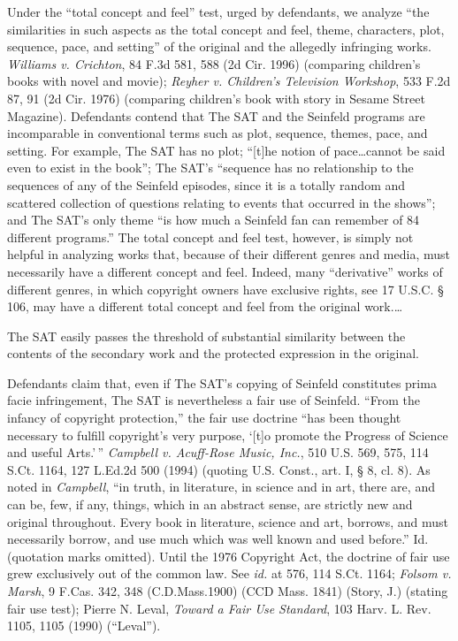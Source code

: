 Under the ``total concept and feel'' test, urged by defendants, we analyze ``the
similarities in such aspects as the total concept and feel, theme, characters,
plot, sequence, pace, and setting'' of the original and the allegedly
infringing works. \emph{Williams v. Crichton}, 84 F.3d 581, 588 (2d Cir. 1996)
(comparing children's books with novel and movie); \emph{Reyher v. Children's
Television Workshop}, 533 F.2d 87, 91 (2d Cir. 1976) (comparing children's book
with story in Sesame Street Magazine). Defendants contend that The SAT and the
Seinfeld programs are incomparable in conventional terms such as plot,
sequence, themes, pace, and setting. For example, The SAT has no plot; ``[t]he
notion of pace\ldots cannot be said even to exist in the book''; The SAT's
``sequence has no relationship to the sequences of any of the Seinfeld
episodes, since it is a totally random and scattered collection of questions
relating to events that occurred in the shows''; and The SAT's only theme ``is
how much a Seinfeld fan can remember of 84 different programs.'' The total
concept and feel test, however, is simply not helpful in analyzing works that,
because of their different genres and media, must necessarily have a different
concept and feel. Indeed, many ``derivative'' works of different genres, in
which copyright owners have exclusive rights, see 17 U.S.C. {\S} 106, may have
a different total concept and feel from the original work.\ldots

The SAT easily passes the threshold of substantial similarity between the
contents of the secondary work and the protected expression in the original.


Defendants claim that, even if The SAT's copying of Seinfeld constitutes prima
facie infringement, The SAT is nevertheless a fair use of Seinfeld. ``From the
infancy of copyright protection,'' the fair use doctrine ``has been thought
necessary to fulfill copyright's very purpose, `[t]o promote
the Progress of Science and useful Arts.'\,'' \emph{Campbell v. Acuff-Rose
Music, Inc.}, 510 U.S. 569, 575, 114 S.Ct. 1164, 127 L.Ed.2d 500 (1994) (quoting
U.S. Const., art. I, {\S} 8, cl. 8). As noted in \emph{Campbell}, ``in truth, in
literature, in science and in art, there are, and can be, few, if any, things,
which in an abstract sense, are strictly new and original throughout. Every
book in literature, science and art, borrows, and must necessarily borrow, and
use much which was well known and used before.'' Id. (quotation marks omitted).
Until the 1976 Copyright Act, the doctrine of fair use grew exclusively out of
the common law. See \emph{id.} at 576, 114 S.Ct. 1164; \emph{Folsom v. Marsh}, 9
F.Cas. 342,
348 (C.D.Mass.1900) (CCD Mass. 1841) (Story, J.) (stating fair use test);
Pierre N. Leval, \emph{Toward a Fair Use Standard}, 103 Harv. L. Rev. 1105, 1105
(1990)
(``Leval'').

